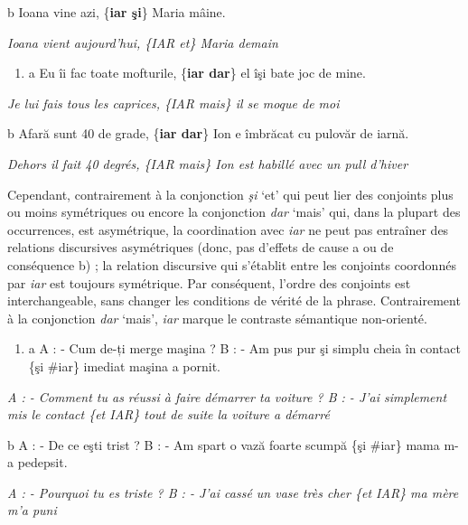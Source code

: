   b  Ioana vine azi, \{\textbf{iar {\textbar} şi}\} Maria mâine.

{\itshape
Ioana vient aujourd'hui, \{IAR {\textbar} et\} Maria demain}


\begin{enumerate}
\item \label{bkm:Ref301963751}a  Eu îi fac toate mofturile, \{\textbf{iar {\textbar} dar}\} el îşi bate joc de mine.


\end{enumerate}
{\itshape
Je lui fais tous les caprices, \{IAR {\textbar} mais\} il se moque de moi}

  b  Afară sunt 40 de grade, \{\textbf{iar {\textbar} dar}\} Ion e îmbrăcat cu pulovăr de iarnă.

{\itshape
Dehors il fait 40 degrés, \{IAR {\textbar} mais\} Ion est habillé avec un pull d'hiver} 

Cependant, contrairement à la conjonction \textit{şi} `et' qui peut lier des conjoints plus ou moins symétriques ou encore la conjonction \textit{dar} `mais' qui, dans la plupart des occurrences, est asymétrique, la coordination avec \textit{iar} ne peut pas entraîner des relations discursives asymétriques (donc, pas d'effets de cause a ou de conséquence b) ; la relation discursive qui s'établit entre les conjoints coordonnés par \textit{iar} est toujours symétrique. Par conséquent, l'ordre des conjoints est interchangeable, sans changer les conditions de vérité de la phrase. Contrairement à la conjonction \textit{dar} `mais', \textit{iar} marque le contraste sémantique non-orienté. 


\begin{enumerate}
\item \label{bkm:Ref301964614}a  A : - Cum de-ți merge maşina ? B : - Am pus pur şi simplu cheia în contact \{şi {\textbar} \#iar\} imediat maşina a pornit.


\end{enumerate}
{\itshape
A : - Comment tu as réussi à faire démarrer ta voiture ? B : - J'ai simplement mis le contact \{et {\textbar} IAR\} tout de suite la voiture a démarré}

  b  A : - De ce eşti trist ? B : - Am spart o vază foarte scumpă \{şi {\textbar} \#iar\} mama m-a pedepsit.

\textit{A : - Pourquoi tu es triste ? B : - J'ai cassé un vase très cher \{et {\textbar} IAR\} ma mère m'a puni}  

